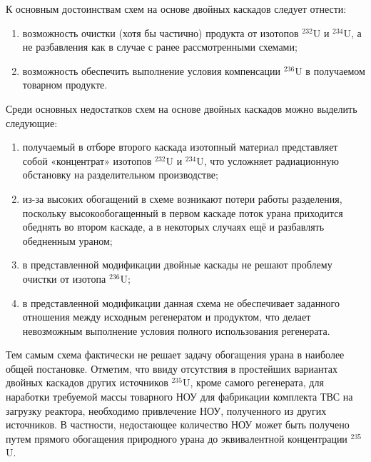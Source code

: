К основным достоинствам схем на основе двойных каскадов следует отнести:

\begin{enumerate}
  \item	возможность очистки (хотя бы частично) продукта от изотопов $^{232}$U и $^{234}$U, а не разбавления как в случае с ранее рассмотренными схемами; 
  \item	возможность обеспечить выполнение условия компенсации $^{236}$U в получаемом товарном продукте.
\end{enumerate}

Среди основных недостатков схем на основе двойных каскадов можно выделить следующие: 
\begin{enumerate}
  \item	получаемый в отборе второго каскада изотопный материал представляет собой «концентрат» изотопов $^{232}$U и $^{234}$U, что усложняет радиационную обстановку на разделительном производстве; 
  \item	из-за высоких обогащений в схеме возникают потери работы разделения, поскольку высокообогащенный в первом каскаде поток урана приходится обеднять во втором каскаде, а в некоторых случаях ещё и разбавлять обедненным ураном;
  \item	в представленной модификации двойные каскады не решают проблему очистки от изотопа $^{236}$U;
  \item в представленной модификации данная схема не обеспечивает заданного отношения между исходным регенератом и продуктом, что делает невозможным выполнение условия полного использования регенерата.
\end{enumerate}

Тем самым схема фактически не решает задачу обогащения урана в наиболее общей постановке.
Отметим, что ввиду отсутствия в простейших вариантах двойных каскадов других источников $^{235}$U, кроме самого регенерата, для наработки требуемой массы товарного НОУ для фабрикации комплекта ТВС на загрузку реактора, необходимо привлечение НОУ, полученного из других источников. В частности, недостающее количество НОУ может быть получено путем прямого обогащения природного урана до эквивалентной концентрации $^{235}$U.

